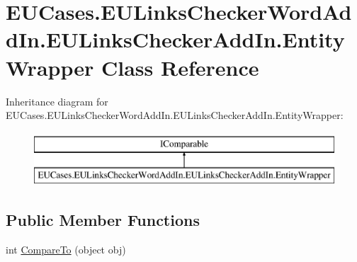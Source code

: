 \hypertarget{class_e_u_cases_1_1_e_u_links_checker_word_add_in_1_1_e_u_links_checker_add_in_1_1_entity_wrapper}{\section{E\+U\+Cases.\+E\+U\+Links\+Checker\+Word\+Add\+In.\+E\+U\+Links\+Checker\+Add\+In.\+Entity\+Wrapper Class Reference}
\label{class_e_u_cases_1_1_e_u_links_checker_word_add_in_1_1_e_u_links_checker_add_in_1_1_entity_wrapper}
}
Inheritance diagram for E\+U\+Cases.\+E\+U\+Links\+Checker\+Word\+Add\+In.\+E\+U\+Links\+Checker\+Add\+In.\+Entity\+Wrapper\+:\begin{figure}[H]
\begin{center}
\leavevmode
\includegraphics[height=2.000000cm]{class_e_u_cases_1_1_e_u_links_checker_word_add_in_1_1_e_u_links_checker_add_in_1_1_entity_wrapper}
\end{center}
\end{figure}
\subsection*{Public Member Functions}
\begin{DoxyCompactItemize}
\item 
int \hyperlink{class_e_u_cases_1_1_e_u_links_checker_word_add_in_1_1_e_u_links_checker_add_in_1_1_entity_wrapper_a97cb8562b791f6bc16bb081c33a57f34}{Compare\+To} (object obj)
\end{DoxyCompactItemize}
